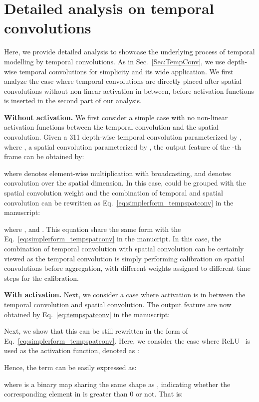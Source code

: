 \documentclass{article} \usepackage{iclr2022_conference,times}
\def\x{}
\begin{document}
\section{Detailed analysis on temporal convolutions}
\label{appendix:tempconvs}
Here, we provide detailed analysis to showcase the underlying process of temporal modelling by temporal convolutions. As in Sec.~\ref{Sec:TempConv}, we use depth-wise temporal convolutions for simplicity and its wide application. We first analyze the case where temporal convolutions are directly placed after spatial convolutions without non-linear activation in between, before activation functions is inserted in the second part of our analysis. 


\textbf{Without activation. }We first consider a simple case with no non-linear activation functions between the temporal convolution and the spatial convolution. 
Given a 3\x1\x1 depth-wise temporal convolution parameterized by , where , a spatial convolution parameterized by , the output feature  of the -th frame can be obtained by:

\noindent where  denotes element-wise multiplication with broadcasting, and  denotes convolution over the spatial dimension. 
In this case,  could be grouped with the spatial convolution weight  and the combination of temporal and spatial convolution can be rewritten as Eq.~\ref{eq:simplerform_tempspatconv} in the manuscript:

\noindent where ,  and . 
This equation share the same form with the Eq.~\ref{eq:simplerform_tempspatconv} in the manucript.
In this case, the combination of temporal convolution with spatial convolution can be certainly viewed as the temporal convolution is simply performing calibration on spatial convolutions before aggregation, with different weights assigned to different time steps for the calibration. 

\textbf{With activation.} Next, we consider a case where activation is in between the temporal convolution and spatial convolution. The output feature  are now obtained by Eq.~\ref{eq:tempspatconv} in the manuscript:


Next, we show that this can be still rewritten in the form of Eq.~\ref{eq:simplerform_tempspatconv}. Here, we consider the case where ReLU~\citep{relu} is used as the activation function, denoted as :

Hence, the term  can be easily expressed as:

\noindent where  is a binary map sharing the same shape as , indicating whether the corresponding element in  is greater than 0 or not. That is:
\end{document}
